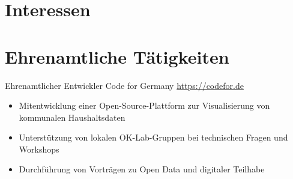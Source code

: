 \documentclass[a4paper, serif, 10pt]{moderncv}
\begin{document}
\section{Interessen}

\section{Ehrenamtliche Tätigkeiten}

        {Ehrenamtlicher Entwickler}
        {Code for Germany}
        {\url{https://codefor.de}}
        {}
        {\begin{itemize}
\item Mitentwicklung einer Open-Source-Plattform zur Visualisierung von kommunalen Haushaltsdaten
\item Unterstützung von lokalen OK-Lab-Gruppen bei technischen Fragen und Workshops
\item Durchführung von Vorträgen zu Open Data und digitaler Teilhabe
\end{itemize}}
    
\end{document}
